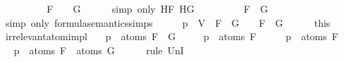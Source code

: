 \begin{isabellebody}
\ \ \isamarkupfalse%
\ \isamarkupfalse%
\ {\isachardoublequoteopen}{\isasymdots}\ {\isacharequal}\ {\isacharparenleft}{\isasymA}\ {\isasymTurnstile}\ F\ {\isasymor}\ {\isasymA}\ {\isasymTurnstile}\ G{\isacharparenright}{\isachardoublequoteclose}\isanewline
\ \ \ \ \isamarkupfalse%
\ {\isacharparenleft}simp\ only{\isacharcolon}\ HF\ HG{\isacharparenright}\isanewline
\ \ \isamarkupfalse%
\ \isamarkupfalse%
\ {\isachardoublequoteopen}{\isasymdots}\ {\isacharequal}\ {\isasymA}\ {\isasymTurnstile}\ {\isacharparenleft}F\ \isactrlbold {\isasymor}\ G{\isacharparenright}{\isachardoublequoteclose}\isanewline
\ \ \ \ \isamarkupfalse%
\ {\isacharparenleft}simp\ only{\isacharcolon}\ formula{\isacharunderscore}semantics{\isachardot}simps{\isacharparenleft}{}{\isacharparenright}{\isacharparenright}\isanewline
\ \ \isamarkupfalse%
\ \isamarkupfalse%
\ {\isachardoublequoteopen}{\isasymA}{\isacharparenleft}p\ {\isacharcolon}{\isacharequal}\ V{\isacharparenright}\ {\isasymTurnstile}\ {\isacharparenleft}F\ \isactrlbold {\isasymor}\ G{\isacharparenright}\ {\isasymlongleftrightarrow}\ {\isasymA}\ {\isasymTurnstile}\ {\isacharparenleft}F\ \isactrlbold {\isasymor}\ G{\isacharparenright}{\isachardoublequoteclose}\isanewline
\ \ \ \ \isamarkupfalse%
\ this\isanewline
{}\isamarkupfalse%
%
\endisatagproof
{\isafoldproof}%
%
\isadelimproof
\isanewline
%
\endisadelimproof
\isanewline
{}\isamarkupfalse%
\ irrelevant{\isacharunderscore}atom{\isacharunderscore}imp{\isacharunderscore}l{}{\isacharcolon}\isanewline
\ \ \ {\isachardoublequoteopen}p\ {\isasymnotin}\ atoms\ {\isacharparenleft}F\ \isactrlbold {\isasymrightarrow}\ G{\isacharparenright}{\isachardoublequoteclose}\isanewline
\ \ \ \ \ {\isachardoublequoteopen}p\ {\isasymnotin}\ atoms\ F{\isachardoublequoteclose}\isanewline
%
\isadelimproof
%
\endisadelimproof
%
\isatagproof
{}\isamarkupfalse%
\ \isanewline
\ \ \isamarkupfalse%
\ {\isachardoublequoteopen}p\ {\isasymin}\ atoms\ F{\isachardoublequoteclose}\isanewline
\ \ \isamarkupfalse%
\ \isamarkupfalse%
\ {\isachardoublequoteopen}p\ {\isasymin}\ atoms\ F\ {\isasymunion}\ atoms\ G{\isachardoublequoteclose}\isanewline
\ \ \ \ \isamarkupfalse%
\ {\isacharparenleft}rule\ UnI{}{\isacharparenright}\isanewline
\ \ \isamarkupfalse%
\ \isamarkupfalse%

\end{isabellebody}
